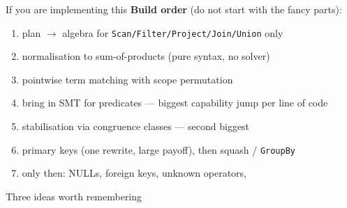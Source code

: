 \documentclass[9pt,aspectratio=169]{beamer}
\begin{document}
\begin{frame}[fragile]{If you are implementing this}
\textbf{Build order} (do not start with the fancy parts):
\begin{enumerate}\small
\item<2-> plan $\to$ algebra for \texttt{Scan/Filter/Project/Join/Union} only
\item<3-> normalisation to sum-of-products (pure syntax, no solver)
\item<4-> pointwise term matching with scope permutation
\item<5-> \alert{bring in SMT for predicates} --- biggest capability jump per line of code
\item<6-> \alert{stabilisation via congruence classes} --- second biggest
\item<7-> primary keys (one rewrite, large payoff), then squash / \texttt{GroupBy}
\item<8-> only then: NULLs, foreign keys, unknown operators, \liastar{}
\end{enumerate}
\end{frame}

\begin{frame}[standout]
Three ideas worth remembering
\end{frame}
\end{document}
